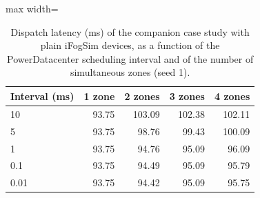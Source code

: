 \begin{table}[htbp]
\centering
\caption{Dispatch latency (ms) of the companion case study with plain iFogSim devices, as a function of the PowerDatacenter scheduling interval and of the number of simultaneous zones (seed 1).}
\label{tab:scheduling}
\begin{adjustbox}{max width=\textwidth}
\begin{tabular}{lrrrr}
\toprule
Interval (ms) & 1 zone & 2 zones & 3 zones & 4 zones \\
\midrule
10 & 93.75 & 103.09 & 102.38 & 102.11 \\
5 & 93.75 & 98.76 & 99.43 & 100.09 \\
1 & 93.75 & 94.76 & 95.09 & 96.09 \\
0.1 & 93.75 & 94.49 & 95.09 & 95.79 \\
0.01 & 93.75 & 94.42 & 95.09 & 95.75 \\
\bottomrule
\end{tabular}
\end{adjustbox}
\end{table}
